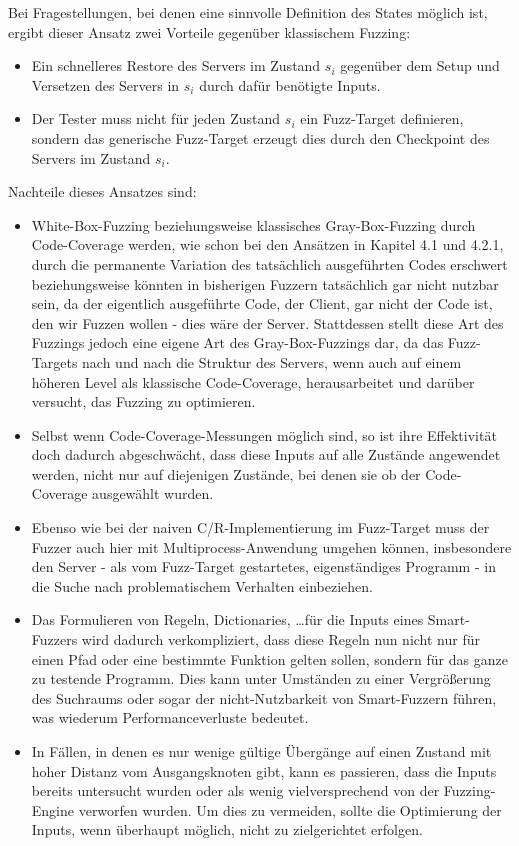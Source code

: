 \documentclass[a4paper]{article}
\begin{document}
Bei Fragestellungen, bei denen eine sinnvolle Definition des States möglich ist, ergibt dieser Ansatz zwei Vorteile gegenüber klassischem Fuzzing:
\begin{itemize}
    \item Ein schnelleres Restore des Servers im Zustand $s_i$ gegenüber dem Setup und Versetzen des Servers in $s_i$ durch dafür benötigte Inputs.
    \item Der Tester muss nicht für jeden Zustand $s_i$ ein Fuzz-Target definieren, sondern das generische Fuzz-Target erzeugt dies durch den Checkpoint des Servers im Zustand $s_i$.
\end{itemize}
Nachteile dieses Ansatzes sind:
\begin{itemize}
    \item White-Box-Fuzzing beziehungsweise klassisches Gray-Box-Fuzzing durch Code-Coverage werden, wie schon bei den Ansätzen in Kapitel 4.1 und 4.2.1, durch die permanente Variation des tatsächlich ausgeführten Codes erschwert beziehungsweise könnten in bisherigen Fuzzern tatsächlich gar nicht nutzbar sein, da der eigentlich ausgeführte Code, der Client, gar nicht der Code ist, den wir Fuzzen wollen - dies wäre der Server. 
        Stattdessen stellt diese Art des Fuzzings jedoch eine eigene Art des Gray-Box-Fuzzings dar, da das Fuzz-Targets nach und nach die Struktur des Servers, wenn auch auf einem höheren Level als klassische Code-Coverage, herausarbeitet und darüber versucht, das Fuzzing zu optimieren.
    \item Selbst wenn Code-Coverage-Messungen möglich sind, so ist ihre Effektivität doch dadurch abgeschwächt, dass diese Inputs auf alle Zustände angewendet werden, nicht nur auf diejenigen Zustände, bei denen sie ob der Code-Coverage ausgewählt wurden. 
    \item Ebenso wie bei der naiven C/R-Implementierung im Fuzz-Target muss der Fuzzer auch hier mit Multiprocess-Anwendung umgehen können, insbesondere den Server - als vom Fuzz-Target gestartetes, eigenständiges Programm - in die Suche nach problematischem Verhalten einbeziehen.
    \item Das Formulieren von Regeln, Dictionaries, \dots für die Inputs eines Smart-Fuzzers wird dadurch verkompliziert, dass diese Regeln nun nicht nur für einen Pfad oder eine bestimmte Funktion gelten sollen, sondern für das ganze zu testende Programm. 
        Dies kann unter Umständen zu einer Vergrößerung des Suchraums oder sogar der nicht-Nutzbarkeit von Smart-Fuzzern führen, was wiederum Performanceverluste bedeutet.
    \item In Fällen, in denen es nur wenige gültige Übergänge auf einen Zustand mit hoher Distanz vom Ausgangsknoten gibt, kann es passieren, dass die Inputs bereits untersucht wurden oder als wenig vielversprechend von der Fuzzing-Engine verworfen wurden. Um dies zu vermeiden, sollte die Optimierung der Inputs, wenn überhaupt möglich, nicht zu zielgerichtet erfolgen.
    
\end{itemize}
\end{document}
